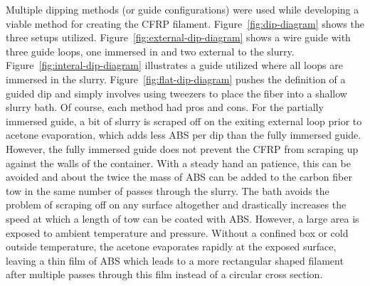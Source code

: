 
%
%

Multiple dipping methods (or guide configurations) were used while developing a viable method for creating the CFRP filament. Figure~\ref{fig:dip-diagram} shows the three setups utilized. Figure~\ref{fig:external-dip-diagram} shows a wire guide with three guide loops, one immersed in and two external to the slurry. Figure~\ref{fig:interal-dip-diagram} illustrates a guide utilized where all loops are immersed in the slurry. Figure~\ref{fig:flat-dip-diagram} pushes the definition of a guided dip and simply involves using tweezers to place the fiber into a shallow slurry bath. Of course, each method had pros and cons. For the partially immersed guide, a bit of slurry is scraped off on the exiting external loop prior to acetone evaporation, which adds less ABS per dip than the fully immersed guide. However, the fully immersed guide does not prevent the CFRP from scraping up against the walls of the container. With a steady hand an patience, this can be avoided and about the twice the mass of ABS can be added to the carbon fiber tow in the same number of passes through the slurry. The bath avoids the problem of scraping off on any surface altogether and drastically increases the speed at which a length of tow can be coated with ABS. However, a large area is exposed to ambient temperature and pressure. Without a confined box or cold outside temperature, the acetone evaporates rapidly at the exposed surface, leaving a thin film of ABS which leads to a more rectangular shaped filament after multiple passes through this film instead of a circular cross section. \\


